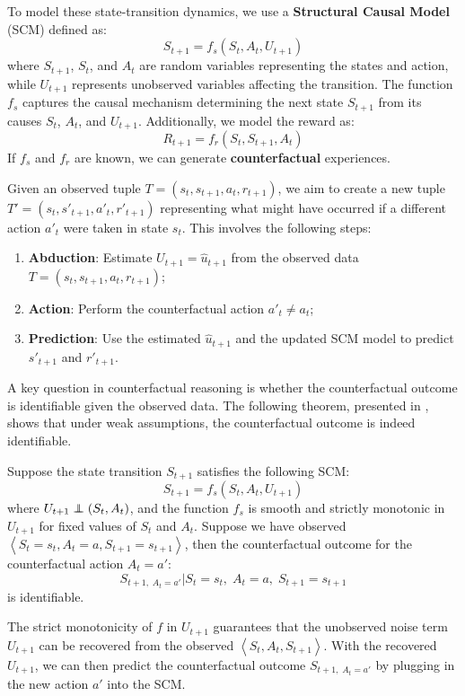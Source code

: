 To model these state-transition dynamics, we use a
\textbf{Structural Causal Model} (SCM)
defined as:
\[
S_{t+1} = f_s(S_t, A_t, U_{t+1})
\]
where \( S_{t+1} \), \( S_t \), and \( A_t \) are random variables representing
the states and action, while \( U_{t+1} \) represents unobserved
variables affecting the transition.
The function \( f_s \) captures the causal mechanism
determining the next state \( S_{t+1} \) from its causes
\( S_t \), \( A_t \), and \( U_{t+1} \).
Additionally, we model the reward as:
\[
R_{t+1} = f_r(S_t, S_{t+1}, A_t)
\]
If \( f_s \) and \( f_r \) are known, we can generate
\textbf{counterfactual} experiences.

Given an observed tuple \( T = (s_t, s_{t+1}, a_t, r_{t+1}) \),
we aim to create a new tuple \( T' = (s_t, s'_{t+1}, a'_t, r'_{t+1}) \)
representing what might have occurred if a different action \( a'_t \)
were taken in state \( s_t \). This involves the following steps:
\begin{enumerate}
    \item \textbf{Abduction}: Estimate \( U_{t+1} = \hat{u}_{t+1} \)
    from the observed data \( T = (s_t, s_{t+1}, a_t, r_{t+1}) \);
    \item \textbf{Action}: Perform the counterfactual action
    \( a'_t \neq a_t \);
    \item \textbf{Prediction}: Use the estimated \( \hat{u}_{t+1} \)
    and the updated SCM model to predict \( s'_{t+1} \) and \( r'_{t+1} \).
\end{enumerate}

A key question in counterfactual reasoning is whether the counterfactual
outcome is identifiable given the observed data. The following
theorem, presented in \cite{lu2020},
shows that under weak assumptions, the counterfactual outcome
is indeed identifiable.

\begin{theorem}
    Suppose the state transition $S_{t+1}$ satisfies the following SCM:
    $$S_{t+1} = f_s(S_t, A_t, U_{t+1})$$
    where $U_{t+1} \independent (S_t, A_t)$,
    and the function $f_s$ is smooth and strictly monotonic
    in $U_{t+1}$ for fixed values of $S_t$ and $A_t$.
    Suppose we have observed $\left\langle S_t = s_t, A_t = a, S_{t+1} = s_{t+1}\right\rangle $,
    then the counterfactual outcome for the counterfactual action $A_t = a'$:
    $$S_{t+1,\; A_t=a'} | S_t = s_t,\; A_t = a,\; S_{t+1} = s_{t+1}$$ is identifiable.
\end{theorem}

The strict monotonicity of $f$ in $U_{t+1}$ guarantees that the unobserved
noise term $U_{t+1}$ can be recovered from the observed
$\left\langle S_t, A_t, S_{t+1}\right\rangle $.
With the recovered $U_{t+1}$, we can then predict the counterfactual outcome
$S_{t+1,\; A_t=a'}$ by plugging in the new action $a'$ into the SCM.

